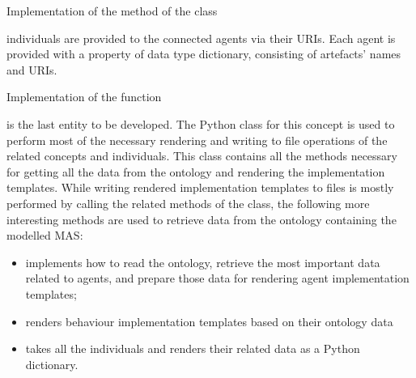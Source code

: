 \begin{listing}
    \caption{Implementation of the  method of the  class}
    \label{lst: mago-ag plan get_plan_action_behaviour_objective}
\end{listing}



individuals are provided to the connected agents via their \acp{URI}.
%
Each agent is provided with a property of data type dictionary,
%
consisting of artefacts' names and \acp{URI}.

\begin{listing}
    \caption{Implementation of the  function}
    \label{lst: mago-ag aux get_related_knowledge_artefact_uris}
\end{listing}



is the last entity to be developed. The Python class for this concept is used to perform most of the necessary rendering and writing to file operations of the related concepts and individuals. This class contains all the methods necessary for getting all the data from the ontology and rendering the implementation templates. While writing rendered implementation templates to files is mostly performed by calling the related methods of the  class, the following more interesting methods are used to retrieve data from the ontology containing the modelled \ac{MAS}:

\begin{itemize}
    \item {} implements
    how to read the ontology, retrieve the most important data related to agents, and prepare those data for rendering agent implementation templates;
    
    \item {} renders
    behaviour implementation templates based on their ontology data
    
    \item {} takes
    all the  individuals and renders their related data as a Python dictionary.
\end{itemize}

